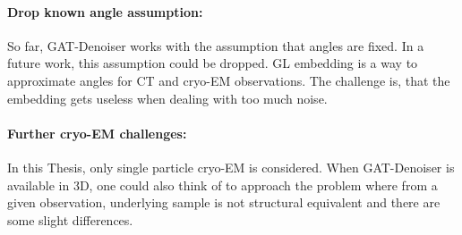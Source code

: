 \paragraph{Drop known angle assumption:}
So far, GAT-Denoiser works with the assumption that angles are fixed.
In a future work, this assumption could be dropped. GL embedding
is a way to approximate angles for CT and cryo-EM observations.
The challenge is, that the embedding gets
 useless when dealing with too much noise.

\paragraph{Further cryo-EM challenges:}
In this Thesis, only single particle cryo-EM is considered.
When GAT-Denoiser is available in 3D, one could also think of to approach
the problem where from a given observation, underlying sample is not 
structural equivalent and there are some slight differences. 

